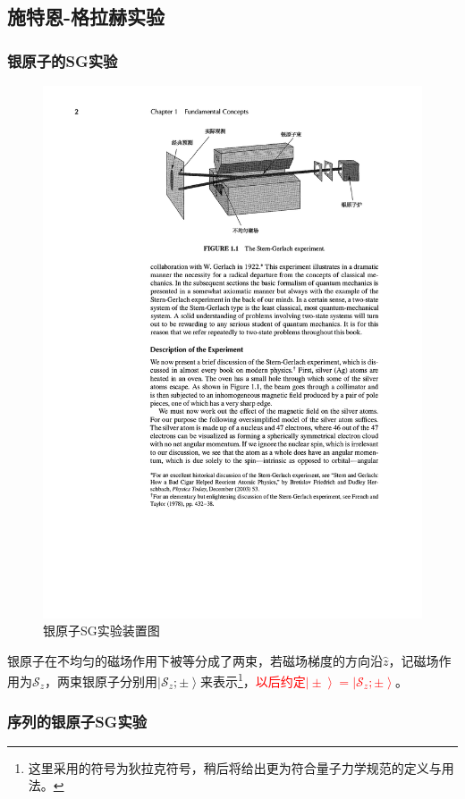 \documentclass[UTF8,12pt]{article}
\providecommand\Ket[1]{\left|\right. #1 \left.\right\rangle}
\numberwithin{equation}{subsection}
\providecommand{\empR}[1]{\textcolor{red}{#1}}
\begin{document}
	\subsection{施特恩-格拉赫实验}
	\subsubsection{银原子的SG实验}
	\begin{figure}[H]
		\centering
		\includegraphics[width=0.4\linewidth]{SGe.pdf}
		\caption{银原子SG实验装置图}
	\end{figure}
	
	银原子在不均匀的磁场作用下被等分成了两束，若磁场梯度的方向沿$\hat z$，记磁场作用为$\mathcal S_z$，两束银原子分别用$\Ket{\mathcal S_z;\pm}$来表示\footnote{这里采用的符号为狄拉克符号，稍后将给出更为符合量子力学规范的定义与用法。}，\empR{以后约定$\Ket{\pm}=\Ket{\mathcal S_z;\pm}$}。
	
	\subsubsection{序列的银原子SG实验}
	
\end{document}

